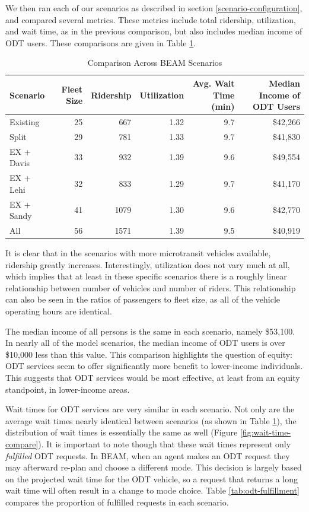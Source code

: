 \documentclass[
]{report}
\begin{document}
We then ran each of our scenarios as described in section \ref{scenario-configuration}, and compared several metrics. These metrics include total ridership, utilization, and wait time, as in the previous comparison, but also includes median income of ODT users. These comparisons are given in Table \ref{tab:scenario-compare}.

\begin{table}

\caption{\label{tab:scenario-compare}Comparison Across BEAM Scenarios}
\centering
\begin{tabular}[t]{lrrrrr}
\toprule
Scenario & Fleet Size & Ridership & Utilization & Avg. Wait Time (min) & Median Income of ODT Users\\
\midrule
Existing & 25 & 667 & 1.32 & 9.7 & \$42,266\\
Split & 29 & 781 & 1.33 & 9.7 & \$41,830\\
EX + Davis & 33 & 932 & 1.39 & 9.6 & \$49,554\\
EX + Lehi & 32 & 833 & 1.29 & 9.7 & \$41,170\\
EX + Sandy & 41 & 1079 & 1.30 & 9.6 & \$42,770\\
\addlinespace
All & 56 & 1571 & 1.39 & 9.5 & \$40,919\\
\bottomrule
\end{tabular}
\end{table}

It is clear that in the scenarios with more microtransit vehicles available, ridership greatly increases. Interestingly, utilization does not vary much at all, which implies that at least in these specific scenarios there is a roughly linear relationship between number of vehicles and number of riders. This relationship can also be seen in the ratios of passengers to fleet size, as all of the vehicle operating hours are identical.

The median income of all persons is the same in each scenario, namely \$53,100. In nearly all of the model scenarios, the median income of ODT users is over \$10,000 less than this value. This comparison highlights the question of equity: ODT services seem to offer significantly more benefit to lower-income individuals. This suggests that ODT services would be most effective, at least from an equity standpoint, in lower-income areas.

Wait times for ODT services are very similar in each scenario. Not only are the average wait times nearly identical between scenarios (as shown in Table \ref{tab:scenario-compare}), the distribution of wait times is essentially the same as well (Figure \ref{fig:wait-time-compare}). It is important to note though that these wait times represent only \emph{fulfilled} ODT requests. In BEAM, when an agent makes an ODT request they may afterward re-plan and choose a different mode. This decision is largely based on the projected wait time for the ODT vehicle, so a request that returns a long wait time will often result in a change to mode choice. Table \ref{tab:odt-fulfillment} compares the proportion of fulfilled requests in each scenario.
\end{document}
